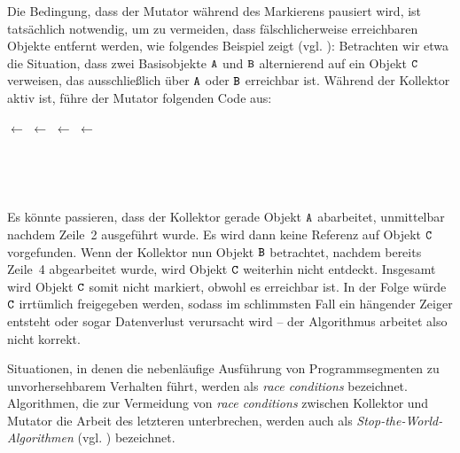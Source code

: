 Die Bedingung, dass der Mutator während des Markierens pausiert wird, ist tatsächlich notwendig, um zu vermeiden, dass fälschlicherweise erreichbaren Objekte entfernt werden, wie folgendes Beispiel zeigt (vgl. \cite[969]{dijkstra1978}):
Betrachten wir etwa die Situation, dass zwei Basisobjekte $\texttt{A}$ und $\texttt{B}$ alternierend auf ein Objekt $\texttt{C}$ verweisen, das ausschließlich über $\texttt{A}$ oder $\texttt{B}$ erreichbar ist.
Während der Kollektor aktiv ist, führe der Mutator folgenden Code aus:

\begin{center}
\begin{minipage}{0.3\textwidth}
	\centering
	\begin{algorithmic}[1]
		\State {} $\gets$ 
		\State {} $\gets$ \Null
		\State {} $\gets$ 
		\State {} $\gets$ \Null
	\end{algorithmic}
\end{minipage}~
\begin{minipage}{0.3\textwidth}
	\centering
	
\end{minipage}~
\begin{minipage}{0.3\textwidth}
	\centering
	
\end{minipage}
\end{center}

Es könnte passieren, dass der Kollektor gerade Objekt $\texttt{A}$ abarbeitet, unmittelbar nachdem Zeile~2 ausgeführt wurde.
Es wird dann keine Referenz auf Objekt $\texttt{C}$ vorgefunden.
Wenn der Kollektor nun Objekt $\texttt{B}$ betrachtet, nachdem bereits Zeile~4 abgearbeitet wurde, wird Objekt $\texttt{C}$ weiterhin nicht entdeckt.
Insgesamt wird Objekt $\texttt{C}$ somit nicht markiert, obwohl es erreichbar ist.
In der Folge würde $\texttt{C}$ irrtümlich freigegeben werden, sodass im schlimmsten Fall ein hängender Zeiger entsteht oder sogar Datenverlust verursacht wird -- der Algorithmus arbeitet also nicht korrekt.

Situationen, in denen die nebenläufige Ausführung von Programmsegmenten zu unvorhersehbarem Verhalten führt, werden als \textit{race conditions} bezeichnet.
Algorithmen, die zur Vermeidung von \textit{race conditions} zwischen Kollektor und Mutator die Arbeit des letzteren unterbrechen, werden auch als \textit{Stop-the-World-Algorithmen} (vgl. \cite[S. 17]{handbook}) bezeichnet.




